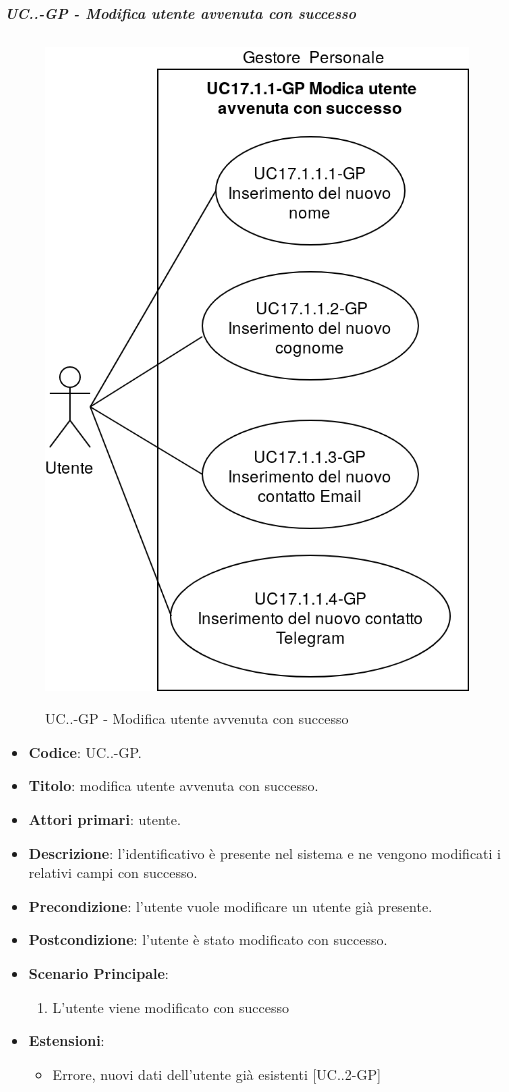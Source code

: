 		\subparagraph{UC\theuccount.\thesubuccount.\thesubsubuccount-GP - Modifica utente avvenuta con successo}
			\begin{figure}[H]
				\centering
				\includegraphics[width=0.5\columnwidth]{img/casi_d'uso/UC17_1_1.png}\\
				\caption{UC\theuccount.\thesubuccount.\thesubsubuccount-GP - Modifica utente avvenuta con successo}
			\end{figure}
			\begin{itemize}
				\item \textbf{Codice}: UC\theuccount.\thesubuccount.\thesubsubuccount-GP.
				\item \textbf{Titolo}: modifica utente avvenuta con successo.
				\item \textbf{Attori primari}: utente.
				\item \textbf{Descrizione}: l'identificativo è presente nel sistema e ne vengono modificati i relativi campi con successo.
				\item \textbf{Precondizione}: l'utente vuole modificare un utente già presente.
				\item \textbf{Postcondizione}: l'utente è stato modificato con successo.
				\item \textbf{Scenario Principale}:
				\begin{enumerate}
					\item L'utente viene modificato con successo
				\end{enumerate}
				\item \textbf{Estensioni}:
				\begin{itemize}
					\item Errore, nuovi dati dell'utente già esistenti [UC\theuccount.\thesubuccount.2-GP]
				\end{itemize}
			\end{itemize}
			
